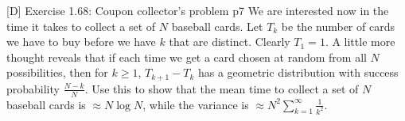 \documentclass[a4paper, 11pt]{article}
\begin{document}
\begin{problem}{%
		[D] Exercise 1.68: Coupon collector's problem 
	}{p7%
	}
We are interested now in the time it takes to collect a set of $N$ baseball cards. Let $T_k$ be the number of cards we have to buy before we have $k$  that are distinct. Clearly $T_1=1$. A little more thought reveals that if each time we get a card chosen at random from all $N$ possibilities, then for $k\geq 1$, $T_{k+1}-T_k$ has a geometric distribution with success probability $\frac{N-k}{N}$. Use this to show that the mean time to collect a set of $N$ baseball cards is $\approx N\log N$, while the variance is $\approx N^2\sum\limits_{k=1}^{\infty}\frac1{k^2}$.
\end{problem}
\end{document}
